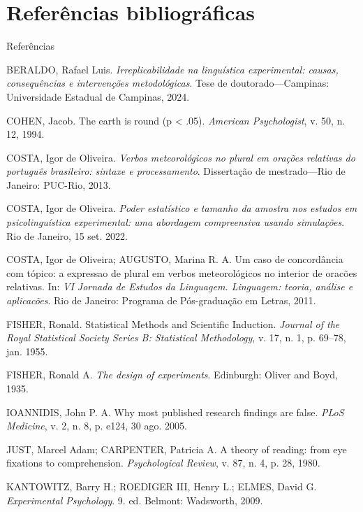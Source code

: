 \documentclass[numbering=fraction,aspectratio=169]{beamer}
\begin{document}
\section{Referências bibliográficas}

\begin{frame}[allowframebreaks]{Referências}
  \begin{thebibliography}{9}

    BERALDO, Rafael Luis. \emph{Irreplicabilidade na linguística experimental: causas, consequências e intervenções metodológicas}. Tese de doutorado—Campinas: Universidade Estadual de Campinas, 2024.

    COHEN, Jacob. The earth is round (p < .05). \emph{American Psychologist}, v. 50, n. 12, 1994.

    COSTA, Igor de Oliveira. \emph{Verbos meteorológicos no plural em orações relativas do português brasileiro: sintaxe e processamento}. Dissertação de mestrado—Rio de Janeiro: PUC-Rio, 2013.

    COSTA, Igor de Oliveira. \emph{Poder estatístico e tamanho da amostra nos estudos em psicolinguística experimental: uma abordagem compreensiva usando simulações}. Rio de Janeiro, 15 set. 2022.

    COSTA, Igor de Oliveira; AUGUSTO, Marina R. A. Um caso de concordância com tópico: a expressao de plural em verbos meteorológicos no interior de oracões relativas. In: \emph{VI Jornada de Estudos da Linguagem. Linguagem: teoria, análise e aplicacões}. Rio de Janeiro: Programa de Pós-graduação em Letras, 2011.

    FISHER, Ronald. Statistical Methods and Scientific Induction. \emph{Journal of the Royal Statistical Society Series B: Statistical Methodology}, v. 17, n. 1, p. 69–78, jan. 1955.

    FISHER, Ronald A. \emph{The design of experiments}. Edinburgh: Oliver and Boyd, 1935.

    IOANNIDIS, John P. A. Why most published research findings are false. \emph{PLoS Medicine}, v. 2, n. 8, p. e124, 30 ago. 2005.

    JUST, Marcel Adam; CARPENTER, Patricia A. A theory of reading: from eye fixations to comprehension. \emph{Psychological Review}, v. 87, n. 4, p. 28, 1980.

    KANTOWITZ, Barry H.; ROEDIGER III, Henry L.; ELMES, David G. \emph{Experimental Psychology}. 9. ed. Belmont: Wadsworth, 2009.


\end{thebibliography}
\end{frame}
\end{document}
